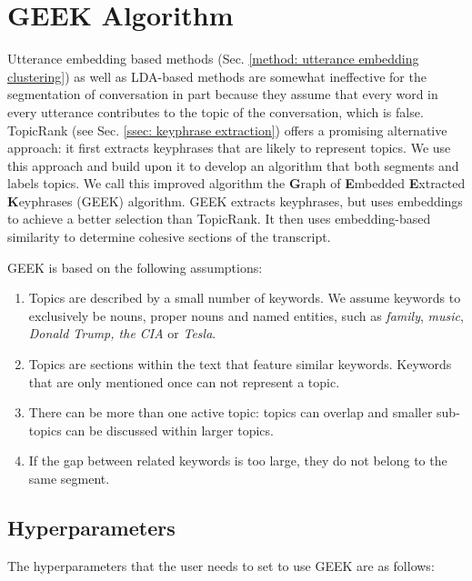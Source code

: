\section{GEEK Algorithm}

Utterance embedding based methods (Sec. \ref{method: utterance embedding clustering}) as well as LDA-based methods are somewhat ineffective for the segmentation of conversation in part because they assume that every word in every utterance contributes to the topic of the conversation, which is false.
TopicRank\cite{bougouin-etal-2013-topicrank} (see Sec. \ref{ssec: keyphrase extraction}) offers a promising alternative approach: it first extracts keyphrases that are likely to represent topics. We use this approach and build upon it to develop an algorithm that both segments and labels topics. We call this improved algorithm the \textbf{G}raph of \textbf{E}mbedded \textbf{E}xtracted \textbf{K}eyphrases (GEEK) algorithm. GEEK extracts keyphrases, but uses embeddings to achieve a better selection than TopicRank. It then uses embedding-based similarity to determine cohesive sections of the transcript.

GEEK is based on the following assumptions:

\begin{enumerate}
    \item Topics are described by a small number of keywords. We assume keywords to exclusively be nouns, proper nouns and named entities, such as \textit{family}, \textit{music}, \textit{Donald Trump, the CIA} or \textit{Tesla}.
    \item Topics are sections within the text that feature similar keywords. Keywords that are only mentioned once can not represent a topic.
    \item There can be more than one active topic: topics can overlap and smaller sub-topics can be discussed within larger topics.
    \item If the gap between related keywords is too large, they do not belong to the same segment.
\end{enumerate}

    \subsection{Hyperparameters}
    The hyperparameters that the user needs to set to use GEEK are as follows:
    
